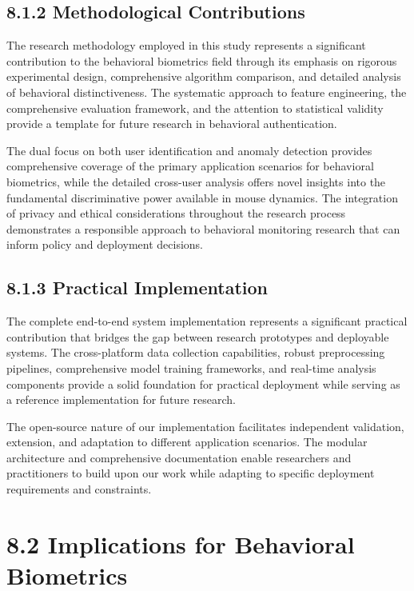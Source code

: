 \documentclass[
  12pt,
  a4paper,
]{report}
\begin{document}
\subsection{8.1.2 Methodological
Contributions}\label{methodological-contributions-1}

The research methodology employed in this study represents a significant
contribution to the behavioral biometrics field through its emphasis on
rigorous experimental design, comprehensive algorithm comparison, and
detailed analysis of behavioral distinctiveness. The systematic approach
to feature engineering, the comprehensive evaluation framework, and the
attention to statistical validity provide a template for future research
in behavioral authentication.

The dual focus on both user identification and anomaly detection
provides comprehensive coverage of the primary application scenarios for
behavioral biometrics, while the detailed cross-user analysis offers
novel insights into the fundamental discriminative power available in
mouse dynamics. The integration of privacy and ethical considerations
throughout the research process demonstrates a responsible approach to
behavioral monitoring research that can inform policy and deployment
decisions.

\subsection{8.1.3 Practical
Implementation}\label{practical-implementation}

The complete end-to-end system implementation represents a significant
practical contribution that bridges the gap between research prototypes
and deployable systems. The cross-platform data collection capabilities,
robust preprocessing pipelines, comprehensive model training frameworks,
and real-time analysis components provide a solid foundation for
practical deployment while serving as a reference implementation for
future research.

The open-source nature of our implementation facilitates independent
validation, extension, and adaptation to different application
scenarios. The modular architecture and comprehensive documentation
enable researchers and practitioners to build upon our work while
adapting to specific deployment requirements and constraints.

\section{8.2 Implications for Behavioral
Biometrics}\label{implications-for-behavioral-biometrics}
\end{document}
